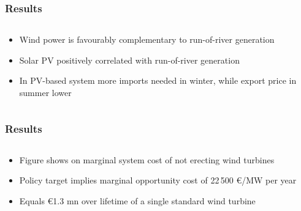 \documentclass[aspectratio=1610, xcolor=dvipsnames]{beamer}
\begin{document}
    \begin{frame}
        \frametitle{Results}
        \begin{columns}[T]
            \begin{column}{5.0 cm}
                \bigskip
                \begin{itemize}
                    \item Wind power is favourably complementary to run-of-river generation
                    \item Solar PV positively correlated with run-of-river generation
                    \item In PV-based system more imports needed in winter, while export price in summer lower
                \end{itemize}
            \end{column}
        \end{columns}
    \end{frame}

    \begin{frame}
        \frametitle{Results}
        \begin{columns}[T]
            \begin{column}{5.0 cm}
                \bigskip
                \begin{itemize}
                    \item Figure shows on marginal system cost of not erecting wind turbines
                    \item Policy target implies marginal opportunity cost of 22\,500 \euro/MW per year
                    \item Equals \euro 1.3 mn over lifetime of a single standard wind turbine
                \end{itemize}
            \end{column}
        \end{columns}
    \end{frame}
\end{document}
